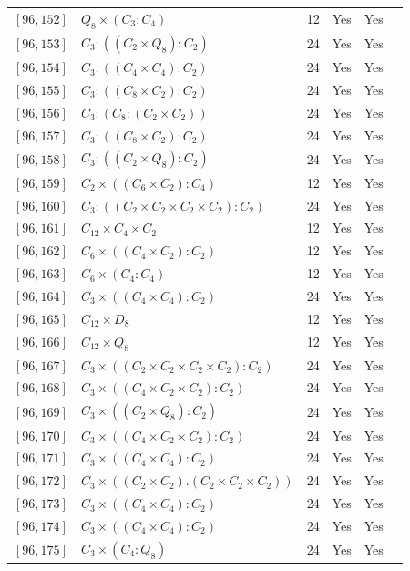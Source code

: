 \documentclass[12pt, a4paper]{article}
\theoremstyle{plain}
\theoremstyle{definition}
\begin{document}
\begin{longtable}{llcccl}
  $[96,152]$ & $Q_8 \times (C_3 : C_4)$ & 12 & Yes & Yes \\
  $[96,153]$ & $C_3 : ((C_2 \times Q_8) : C_2)$ & 24 & Yes & Yes \\
  $[96,154]$ & $C_3 : ((C_4 \times C_4) : C_2)$ & 24 & Yes & Yes \\
  $[96,155]$ & $C_3 : ((C_8 \times C_2) : C_2)$ & 24 & Yes & Yes \\
  $[96,156]$ & $C_3 : (C_8 : (C_2 \times C_2))$ & 24 & Yes & Yes \\
  $[96,157]$ & $C_3 : ((C_8 \times C_2) : C_2)$ & 24 & Yes & Yes \\
  $[96,158]$ & $C_3 : ((C_2 \times Q_8) : C_2)$ & 24 & Yes & Yes \\
  $[96,159]$ & $C_2 \times ((C_6 \times C_2) : C_4)$ & 12 & Yes & Yes \\
  $[96,160]$ & $C_3 : ((C_2 \times C_2 \times C_2 \times C_2) : C_2)$ & 24 & Yes & Yes \\
  $[96,161]$ & $C_{12} \times C_4 \times C_2$ & 12 & Yes & Yes \\
  $[96,162]$ & $C_6 \times ((C_4 \times C_2) : C_2)$ & 12 & Yes & Yes \\
  $[96,163]$ & $C_6 \times (C_4 : C_4)$ & 12 & Yes & Yes \\
  $[96,164]$ & $C_3 \times ((C_4 \times C_4) : C_2)$ & 24 & Yes & Yes \\
  $[96,165]$ & $C_{12} \times D_8$ & 12 & Yes & Yes \\
  $[96,166]$ & $C_{12} \times Q_8$ & 12 & Yes & Yes \\
  $[96,167]$ & $C_3 \times ((C_2 \times C_2 \times C_2 \times C_2) : C_2)$ & 24 & Yes & Yes \\
  $[96,168]$ & $C_3 \times ((C_4 \times C_2 \times C_2) : C_2)$ & 24 & Yes & Yes \\
  $[96,169]$ & $C_3 \times ((C_2 \times Q_8) : C_2)$ & 24 & Yes & Yes \\
  $[96,170]$ & $C_3 \times ((C_4 \times C_2 \times C_2) : C_2)$ & 24 & Yes & Yes \\
  $[96,171]$ & $C_3 \times ((C_4 \times C_4) : C_2)$ & 24 & Yes & Yes \\
  $[96,172]$ & $C_3 \times ((C_2 \times C_2) . (C_2 \times C_2 \times C_2))$ & 24 & Yes & Yes \\
  $[96,173]$ & $C_3 \times ((C_4 \times C_4) : C_2)$ & 24 & Yes & Yes \\
  $[96,174]$ & $C_3 \times ((C_4 \times C_4) : C_2)$ & 24 & Yes & Yes \\
  $[96,175]$ & $C_3 \times (C_4 : Q_8)$ & 24 & Yes & Yes \\

\end{longtable}
\end{document}

